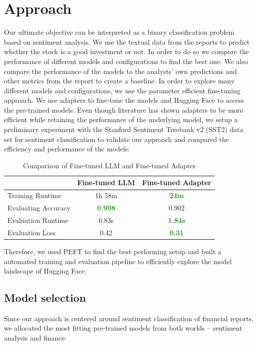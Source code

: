 \documentclass[conference]{IEEEtran}
\begin{document}
\section{Approach}%
Our ultimate objective can be interpreted as a binary classification problem based on sentiment analysis. We use the textual data from the reports to predict whether the stock is a good investment or not. In order to do so we compare the performance of different models and configurations to find the best one. We also compare the performance of the models to the analysts' own predictions and other metrics from the report to create a baseline. In order to explore many different models and configurations, we use the parameter efficient fine-tuning approach. We use adapters to fine-tune the models and Hugging Face to access the pre-trained models. Even though literature has shown adapters to be more efficient while retaining the performance of the underlying model, we setup a preliminary experiment with the Stanford Sentiment Treebank v2 (SST2) data set for sentiment classification to validate our approach and compared the efficiency and performance of the models:

\begin{table}[h!]
    \centering
    \begin{tabular}{lcc}
    \toprule
     & \textbf{Fine-tuned LLM} & \textbf{Fine-tuned Adapter} \\ 
     \midrule
    {Training Runtime} & 1h 58m & \textbf{\textcolor{ForestGreen}{24m}} \\ 
    {Evaluating Accuracy} & \textbf{\textcolor{ForestGreen}{0.908}} & 0.902 \\
    {Evaluation Runtime} & 6.83s & \textbf{\textcolor{ForestGreen}{1.84s}} \\ 
    {Evaluation Loss} & 0.42 & \textbf{\textcolor{ForestGreen}{0.31}} \\ 
    \bottomrule
    \end{tabular}
    \caption{Comparison of Fine-tuned LLM and Fine-tuned Adapter}
    \label{tab:comparison}
    \end{table}


Therefore, we used PEFT to find the best performing setup and built a automated training and evaluation pipeline to efficiently explore the model landscape of Hugging Face.

\subsection{Model selection}%
Since our approach is centered around sentiment classification of financial reports, we allocated the most fitting pre-trained models from both worlds -- sentiment analysis and finance: 
\end{document}
